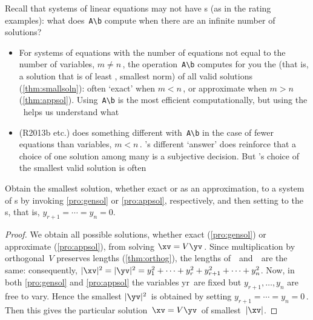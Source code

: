 Recall that systems of linear equations may not have s (as in the rating examples): what does~\verb|A\b| compute when there are an infinite number of solutions?
\begin{itemize}
\item For systems of equations with the number of equations not equal to the number of variables, \(m\neq n\)\,, the \script[2] operation~\verb|A\b| computes for you the \emph{}
(that is, a solution that is of least , smallest norm)
of all valid solutions (\cref{thm:smallsoln}): often `exact' when \(m<n\)\,, or approximate when \(m>n\) (\cref{thm:appsol}).  
Using~\verb|A\b| is the most efficient computationally, but using the \svd\ helps us understand what 

\item \script[1] (R2013b etc.) does something different with~\verb|A\b| in the case of fewer equations than variables, \(m<n\)\,. 
\script[1]'s different `answer' does reinforce that a choice of one solution among many is a subjective decision.
But \script[2]'s choice of the smallest valid solution is often 

\end{itemize}

\begin{theorem} \label{thm:smallsoln}
Obtain the {smallest solution}, whether exact or as an approximation, to a system of s by invoking \cref{pro:gensol} or \cref{pro:appsol}, respectively, and then setting to  the s, that is, \(y_{r+1}=\cdots=y_n=0\).
\end{theorem}
\begin{proof} 
We obtain all possible solutions, whether exact (\cref{pro:gensol}) or approximate (\cref{pro:appsol}), from solving \(\xv=V\yv\)\,.
Since multiplication by orthogonal~\(V\) preserves lengths (\cref{thm:orthog}), the lengths of~\xv\ and~\yv\ are the same: consequently, \(|\xv|^2=|\yv|^2=y_1^2+\cdots+y_r^2+y_{r+1}^2+\cdots+y_n^2\).  
Now, in both \cref{pro:gensol} and \cref{pro:appsol} the variables \hlist yr\ are fixed but \(y_{r+1},\ldots,y_n\) are free to vary.
Hence the smallest \(|\yv|^2\)~is obtained by setting \(y_{r+1}=\cdots=y_n=0\)\,. 
Then this gives the particular solution~\(\xv=V\yv\)\ of smallest~\(|\xv|\).
\end{proof}


